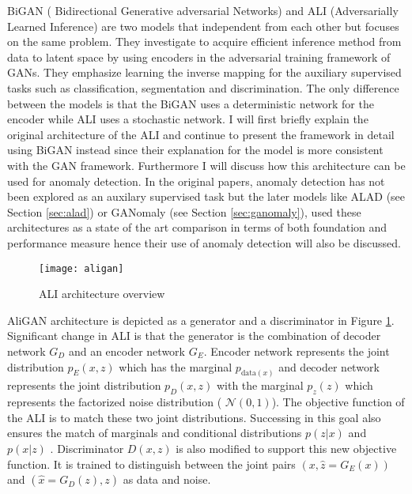  BiGAN ( Bidirectional Generative adversarial Networks) \cite{Donahue2017AdversarialFL} and ALI
 (Adversarially Learned Inference) \cite{Dumoulin2017AdversariallyLI} are two models that
 independent from each other but focuses on the same problem. They investigate to acquire efficient
 inference method from data to latent space by using encoders in the adversarial training framework
 of GANs. They emphasize learning the inverse mapping for the auxiliary supervised tasks such as
 classification, segmentation and discrimination. The only difference between the models is that the
 BiGAN uses a deterministic network for the encoder while ALI uses a stochastic network. I will
 first briefly explain the original architecture of the ALI and continue to present the framework in
 detail using BiGAN instead since their explanation for the model is more consistent with the GAN
 framework. Furthermore I will discuss how this architecture can be used for anomaly detection. In
 the original papers, anomaly detection has not been explored as an auxilary supervised task but the
 later models like ALAD (see Section \ref{sec:alad}) or GANomaly (see Section \ref{sec:ganomaly}), used these
 architectures as a state of the art comparison in terms of both foundation and performance measure
 hence their use of anomaly detection will also be discussed.

\begin{figure}[h!]
	\centering
	\texttt{[image: aligan]}
    \caption{ALI architecture overview}
    \label{fig:aligan_model}
\end{figure}

AliGAN architecture is depicted as a generator and a discriminator in Figure \ref{fig:aligan_model}.
Significant change in ALI is that the generator is the combination of decoder network $G_D$ and an
encoder network $G_E$. Encoder network represents the joint distribution $p_{E}(x, z)$ which has the marginal
$p_{\text{data}(x)}$ and decoder network represents the joint distribution $p_{D}(x, z)$ with the marginal
$p_z(z)$ which represents the factorized noise distribution ( $\mathcal{N}(0, 1)$). The
objective function of the ALI is to match these two joint distributions. Successing in this goal
also ensures the match of marginals and conditional distributions $p(z | x)$ and $p(x | z)$
. Discriminator $D(x,z)$ is also modified to support this new objective function. It is trained to
distinguish between the joint pairs  $(x, \hat{z} = G_{E}(x))$ and $(\hat{x} = G_{D}(z), z)$ as data
and noise.

